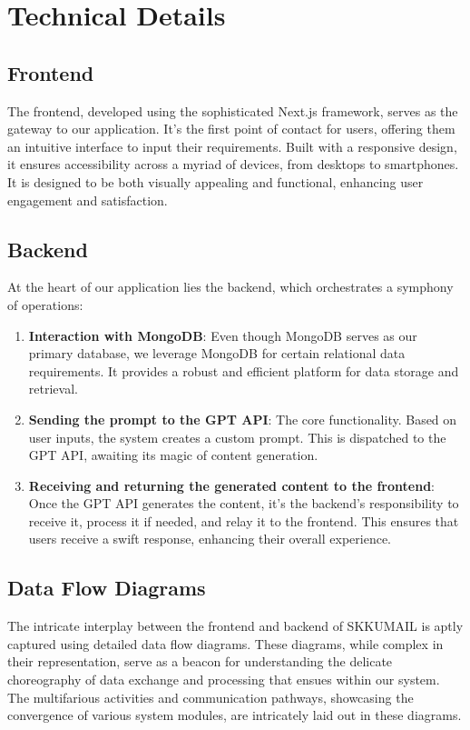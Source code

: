 \documentclass[12pt]{article}
\begin{document}
\section{Technical Details}

\subsection{Frontend}
The frontend, developed using the sophisticated Next.js framework, serves as the gateway to our application. It's the first point of contact for users, offering them an intuitive interface to input their requirements. Built with a responsive design, it ensures accessibility across a myriad of devices, from desktops to smartphones. It is designed to be both visually appealing and functional, enhancing user engagement and satisfaction.

\subsection{Backend}
At the heart of our application lies the backend, which orchestrates a symphony of operations:

\begin{enumerate}
	\item \textbf{Interaction with MongoDB}: Even though MongoDB serves as our primary database, we leverage MongoDB for certain relational data requirements. It provides a robust and efficient platform for data storage and retrieval.
	      	          
	\item \textbf{Sending the prompt to the GPT API}: The core functionality. Based on user inputs, the system creates a custom prompt. This is dispatched to the GPT API, awaiting its magic of content generation.
	      	          
	\item \textbf{Receiving and returning the generated content to the frontend}: Once the GPT API generates the content, it's the backend's responsibility to receive it, process it if needed, and relay it to the frontend. This ensures that users receive a swift response, enhancing their overall experience.
\end{enumerate}

\subsection{Data Flow Diagrams}

The intricate interplay between the frontend and backend of SKKUMAIL is aptly captured using detailed data flow diagrams. These diagrams, while complex in their representation, serve as a beacon for understanding the delicate choreography of data exchange and processing that ensues within our system. The multifarious activities and communication pathways, showcasing the convergence of various system modules, are intricately laid out in these diagrams. 
\end{document}
